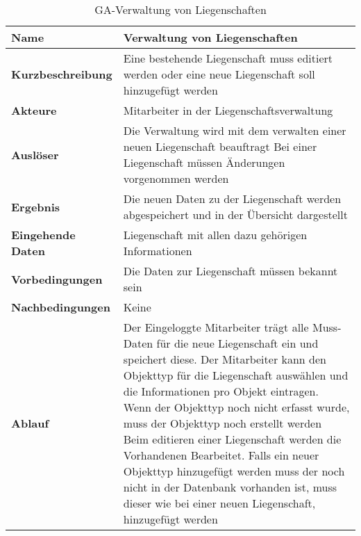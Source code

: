 \begin{table}[H]
  \centering
  \settowidth{}
  \setlength\extrarowheight{2pt}
  \begin{tabulary}{1.0\textwidth}{|a|m{12cm}|}
    \hline
    \textbf{Name}& Verwaltung von Liegenschaften\\
    \hline 
    \textbf{Kurzbeschreibung} & Eine bestehende Liegenschaft muss editiert werden oder eine neue Liegenschaft soll hinzugefügt werden\\
    \hline
    \textbf{Akteure} & Mitarbeiter in der Liegenschaftsverwaltung\\
    \hline
    \textbf{Auslöser} & Die Verwaltung wird mit dem verwalten einer neuen Liegenschaft beauftragt \newline
    Bei einer Liegenschaft müssen Änderungen vorgenommen werden\\
    \hline
    \textbf{Ergebnis} & Die neuen Daten zu der Liegenschaft werden abgespeichert und in der Übersicht dargestellt\\
    \hline
    \textbf{Eingehende Daten} & Liegenschaft mit allen dazu gehörigen Informationen\\
    \hline
    \textbf{Vorbedingungen} & Die Daten zur Liegenschaft müssen bekannt sein\\
    \hline
    \textbf{Nachbedingungen} & Keine\\
    \hline
    \textbf{Ablauf} & Der Eingeloggte Mitarbeiter trägt alle Muss-Daten für die neue Liegenschaft ein und speichert diese. Der Mitarbeiter kann den Objekttyp für die Liegenschaft auswählen und die Informationen pro Objekt eintragen. Wenn der Objekttyp noch nicht erfasst wurde, muss der Objekttyp noch erstellt werden\newline
    Beim editieren einer Liegenschaft werden die Vorhandenen Bearbeitet. Falls ein neuer Objekttyp hinzugefügt werden muss der noch nicht in der Datenbank vorhanden ist, muss dieser wie bei einer neuen Liegenschaft, hinzugefügt werden\\
    \hline
  \end{tabulary}
  \caption{GA-Verwaltung von Liegenschaften}
\end{table}

